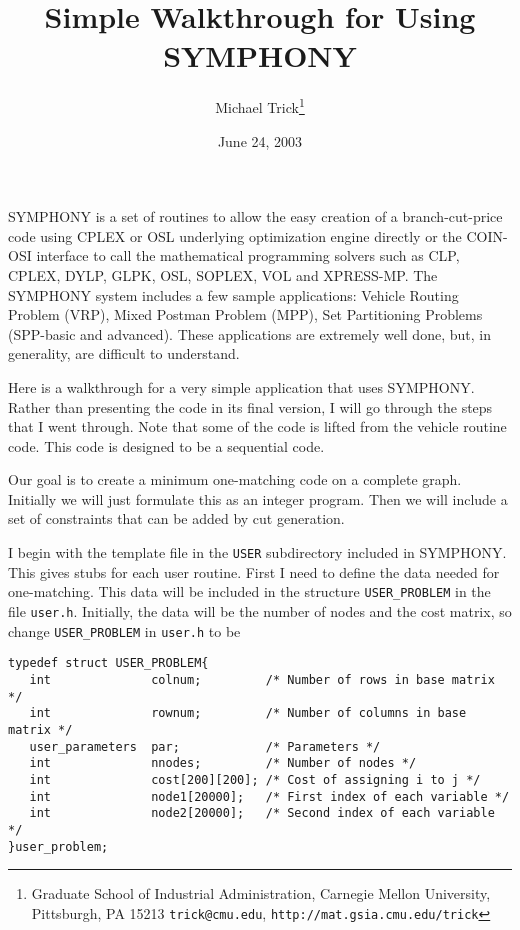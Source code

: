\documentclass[11pt]{article}
\begin{document}
\title{Simple Walkthrough for Using SYMPHONY}
\author{Michael Trick\thanks{Graduate School of Industrial Administration,
Carnegie Mellon University, Pittsburgh, PA 15213 \texttt{trick@cmu.edu}, 
\texttt{http://mat.gsia.cmu.edu/trick}}}

\date{June 24, 2003}
\maketitle
\thispagestyle{empty}

SYMPHONY is a set of routines to allow the easy creation of a branch-cut-price
code using CPLEX or OSL underlying optimization engine directly or the 
COIN-OSI interface to call the mathematical programming solvers such as CLP, 
CPLEX, DYLP, GLPK, OSL, SOPLEX, VOL and XPRESS-MP. The SYMPHONY system 
includes a few sample applications: Vehicle Routing Problem (VRP), Mixed 
Postman Problem (MPP), Set Partitioning Problems (SPP-basic and advanced). 
These applications are extremely well done, but, in generality, are difficult 
to understand.

Here is a walkthrough for a very simple application that uses SYMPHONY. Rather
than presenting the code in its final version, I will go through the steps 
that I went through. Note that some of the code is lifted from the vehicle 
routine code. This code is designed to be a sequential code.

Our goal is to create a minimum one-matching code on a complete graph.
Initially we will just formulate this as an integer program. Then we will
include a set of constraints that can be added by cut generation.

I begin with the template file in the \texttt{USER} subdirectory included in
SYMPHONY. This gives stubs for each user routine. First I need to define the
data needed for one-matching. This data will be included in the structure
\texttt{USER\_PROBLEM} in the file \texttt{user.h}.  Initially, the data will
be the number of nodes and the cost matrix, so change \texttt{USER\_PROBLEM}
in \texttt{user.h} to be

\begin{verbatim}
typedef struct USER_PROBLEM{
   int              colnum;         /* Number of rows in base matrix */
   int              rownum;         /* Number of columns in base matrix */
   user_parameters  par;            /* Parameters */
   int              nnodes;         /* Number of nodes */
   int              cost[200][200]; /* Cost of assigning i to j */ 
   int              node1[20000];   /* First index of each variable */
   int              node2[20000];   /* Second index of each variable */
}user_problem;
\end{verbatim}
\end{document}
